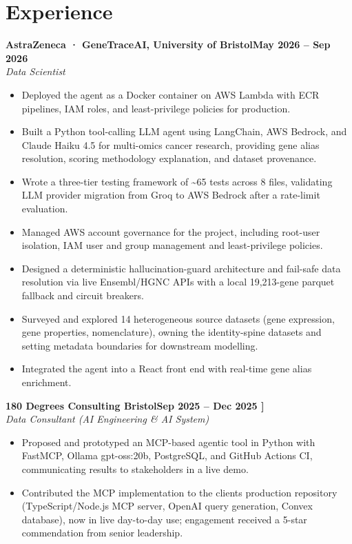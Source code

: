 \documentclass[a4paper,11pt]{article}
\newcommand{\entry}[4]{\needspace{4\baselineskip}\noindent\textbf{#1}\hfill\textbf{#2}\\ \textit{#3}\hfill\textit{#4}\par}
\begin{document}
\section{Experience}
\entry{AstraZeneca · GeneTraceAI, University of Bristol}{May 2026 – Sep 2026}{Data Scientist}{}
\begin{itemize}
  \item Deployed the agent as a Docker container on AWS Lambda with ECR pipelines, IAM roles, and least-privilege policies for production.
  \item Built a Python tool-calling LLM agent using LangChain, AWS Bedrock, and Claude Haiku 4.5 for multi-omics cancer research, providing gene alias resolution, scoring methodology explanation, and dataset provenance.
  \item Wrote a three-tier testing framework of \textasciitilde{}65 tests across 8 files, validating LLM provider migration from Groq to AWS Bedrock after a rate-limit evaluation.
  \item Managed AWS account governance for the project, including root-user isolation, IAM user and group management and least-privilege policies.
  \item Designed a deterministic hallucination-guard architecture and fail-safe data resolution via live Ensembl/HGNC APIs with a local 19,213-gene parquet fallback and circuit breakers.
  \item Surveyed and explored 14 heterogeneous source datasets (gene expression, gene properties, nomenclature), owning the identity-spine datasets and setting metadata boundaries for downstream modelling.
  \item Integrated the agent into a React front end with real-time gene alias enrichment.
\end{itemize}
\vspace{4pt}
\entry{180 Degrees Consulting Bristol}{Sep 2025 – Dec 2025   ]}{Data Consultant (AI Engineering \& AI System)}{}
\begin{itemize}
  \item Proposed and prototyped an MCP-based agentic tool in Python with FastMCP, Ollama gpt-oss:20b, PostgreSQL, and GitHub Actions CI, communicating results to stakeholders in a live demo.
  \item Contributed the MCP implementation to the client\textquotesingle{}s production repository (TypeScript/Node.js MCP server, OpenAI query generation, Convex database), now in live day-to-day use; engagement received a 5-star commendation from senior leadership.
\end{itemize}
\end{document}
